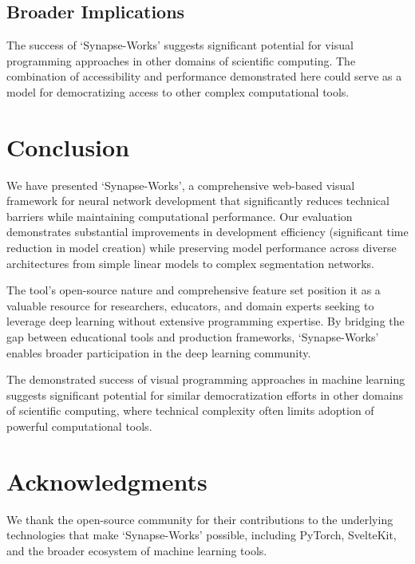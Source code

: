 \documentclass[10pt,conference]{IEEEtran}
\begin{document}
\subsection{Broader Implications}
The success of `Synapse-Works' suggests significant potential for visual
programming approaches in other domains of scientific computing. The
combination of accessibility and performance demonstrated here could serve as a
model for democratizing access to other complex computational tools.

\section{Conclusion}
We have presented `Synapse-Works', a comprehensive web-based visual framework
for neural network development that significantly reduces technical barriers
while maintaining computational performance. Our evaluation demonstrates
substantial improvements in development efficiency (significant time reduction
in model creation) while preserving model performance across diverse
architectures from simple linear models to complex segmentation networks.

The tool's open-source nature and comprehensive feature set position it as a
valuable resource for researchers, educators, and domain experts seeking to
leverage deep learning without extensive programming expertise. By bridging the
gap between educational tools and production frameworks, `Synapse-Works'
enables broader participation in the deep learning community.

The demonstrated success of visual programming approaches in machine learning
suggests significant potential for similar democratization efforts in other
domains of scientific computing, where technical complexity often limits
adoption of powerful computational tools.

\section*{Acknowledgments}
We thank the open-source community for their contributions to the underlying technologies that make `Synapse-Works' possible, including PyTorch, SvelteKit, and the broader ecosystem of machine learning tools.

\balance


\end{document}

